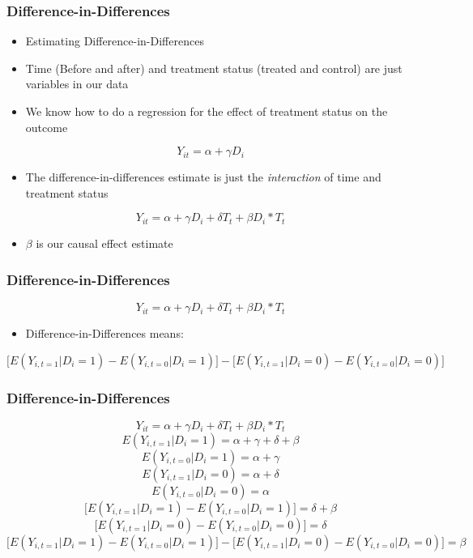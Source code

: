 \documentclass[xcolor=x11names,compress]{beamer}\usepackage[]{graphicx}\usepackage[]{color}
\renewcommand{\(}{\begin{columns}}
\renewcommand{\)}{\end{columns}}
\newcommand{\<}[1]{\begin{column}{#1}}
\renewcommand{\>}{\end{column}}
\begin{document}
\begin{frame}
\frametitle{Difference-in-Differences}
\begin{itemize}
\item Estimating Difference-in-Differences
\pause
\item Time (Before and after) and treatment status (treated and control) are just variables in our data
\pause
\item We know how to do a regression for the effect of treatment status on the outcome
\end{itemize}
$$ Y_{it} = \alpha + \gamma D_i$$
\pause
\begin{itemize}
\item The difference-in-differences estimate is just the \textit{interaction} of time and treatment status
\end{itemize}
$$ Y_{it} = \alpha + \gamma D_i + \delta T_t + \beta D_i * T_t $$
\begin{itemize}
\item $\beta$ is our causal effect estimate
\end{itemize}
\end{frame}

\begin{frame}
\frametitle{Difference-in-Differences}
$$ Y_{it} = \alpha + \gamma D_i + \delta T_t + \beta D_i * T_t $$
\pause
\begin{itemize}
\item Difference-in-Differences means:
\end{itemize}
\small
$$ \big[ E(Y_{i,t=1}|D_i=1) - E(Y_{i,t=0}|D_i=1) \big] - \big[ E(Y_{i,t=1}|D_i=0) - E(Y_{i,t=0}|D_i=0) \big] $$
\normalsize
\end{frame}

\begin{frame}
\frametitle{Difference-in-Differences}
\small
$$ Y_{it} = \alpha + \gamma D_i + \delta T_t + \beta D_i * T_t $$
\pause
$$ E(Y_{i,t=1}|D_i=1) = \alpha + \gamma + \delta + \beta $$
\pause
$$ E(Y_{i,t=0}|D_i=1) = \alpha + \gamma $$
\pause
$$ E(Y_{i,t=1}|D_i=0) = \alpha + \delta $$
\pause
$$ E(Y_{i,t=0}|D_i=0) = \alpha $$
\pause
$$ \big[ E(Y_{i,t=1}|D_i=1) - E(Y_{i,t=0}|D_i=1) \big] = \delta + \beta $$
\pause
$$ \big[ E(Y_{i,t=1}|D_i=0) - E(Y_{i,t=0}|D_i=0) \big] = \delta $$
\pause
\footnotesize
$$ \big[ E(Y_{i,t=1}|D_i=1) - E(Y_{i,t=0}|D_i=1) \big] - \big[ E(Y_{i,t=1}|D_i=0) - E(Y_{i,t=0}|D_i=0) \big] = \beta $$
\normalsize
\end{frame}
\end{document}
